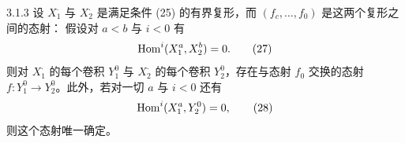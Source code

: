 \begin{lemma}{3.1.3}
设 $X_{1}^{\cdot}$ 与 $X_{2}^{\cdot}$ 是满足条件 (25) 的有界复形，而 $(f_{c},\ldots,f_{0})$ 是这两个复形之间的态射：
假设对 $a<b$ 与 $i<0$ 有
\begin{equation}
\operatorname{Hom}^{i}(X_{1}^{a},X_{2}^{b})=0.
\tag{27}
\end{equation}
则对 $X_{1}^{\cdot}$ 的每个卷积 $Y_{1}^{0}$ 与 $X_{2}^{\cdot}$ 的每个卷积 $Y_{2}^{0}$，存在与态射 $f_{0}$ 交换的态射 $f:Y_{1}^{0}\to Y_{2}^{0}$。此外，若对一切 $a$ 与 $i<0$ 还有
\begin{equation}
\operatorname{Hom}^{i}(X_{1}^{a},Y_{2}^{0})=0,
\tag{28}
\end{equation}
则这个态射唯一确定。
\end{lemma}

